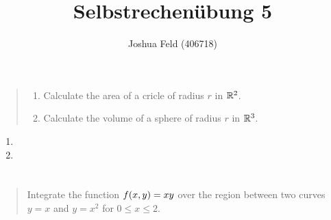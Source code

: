 \documentclass{exercise}
\title{Selbstrechenübung 5}
\author{Joshua Feld (406718)}
\begin{document}
	\maketitle


	\section{}

	\begin{quote}
		\begin{enumerate}
			\item Calculate the area of a cricle of radius \(r\) in \(\mathbb{R}^2\).
			\item Calculate the volume of a sphere of radius \(r\) in \(\mathbb{R}^3\).
		\end{enumerate}
	\end{quote}

	\begin{enumerate}
		\item
		\item
	\end{enumerate}


	\section{}

	\begin{quote}
		Integrate the function \(f\parentheses*{x, y} = xy\) over the region between two curves \(y = x\) and \(y = x^2\) for \(0 \le x \le 2\).
	\end{quote}


	\section{}

	\begin{quote}
		
	\end{quote}


	\section{}

	\begin{quote}
		
	\end{quote}
\end{document}
